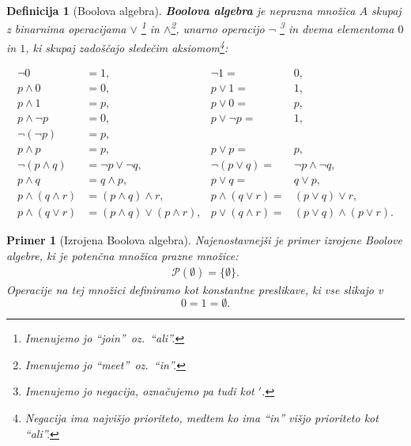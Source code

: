 \documentclass{amsart}
\newtheorem{definicija}[izrek]{Definicija}
\newtheorem{primer}[izrek]{Primer}
\begin{document}
\begin{definicija}[Boolova algebra]
    {\bf Boolova algebra} je neprazna množica \(A\) skupaj z binarnima operacijama \(\vee\) \footnote{Imenujemo jo ``join''\ oz.\ 
    ``ali''.} in \(\wedge\)\footnote{Imenujemo jo ``meet''\ oz.\ ``in''.}, unarno operacijo \(\neg\)
    \footnote{Imenujemo jo negacija, označujemo pa tudi kot \('\).} in dvema  
    elementoma \(0\) in \(1\), ki skupaj zadoščajo sledečim aksiomom\footnote{Negacija ima najvišjo prioriteto, medtem ko ima ``in'' višjo prioriteto kot ``ali''.}:

    \begin{align}
        \label{eq0}
        \neg 0 &= 1, & \neg 1 =& 0,\\ \label{eq1}
        p \wedge 0 &= 0, & p \vee 1 =& 1,\\ \label{eq2}
        p \wedge 1 &= p, & p \vee 0 =& p,\\ \label{eq3}
        p \wedge \neg p &= 0, & p \vee \neg p =& 1,\\ \label{eq4}
         \neg (\neg p) &= p,\\ \label{eq5}
        p \wedge p &= p, & p \vee p =& p,\\ \label{eq6}
        \neg (p \wedge q) &= \neg p \vee \neg q, & \neg (p \vee q) =& \neg p \wedge \neg q,\\ \label{eq7}
        p \wedge q &= q \wedge p, & p \vee q =& q \vee p,\\ \label{eq8}
        p \wedge (q \wedge r) &= (p \wedge q) \wedge r, & p \wedge (q \vee r) =& (p \vee q) \vee r,\\ \label{eq9}
        p \wedge (q \vee r) &= (p \wedge q) \vee (p \wedge r), & p \vee (q \wedge r) =& (p \vee q) \wedge (p \vee r).
    \end{align}
    
\end{definicija}

\begin{primer}[Izrojena Boolova algebra]
    Najenostavnejši je primer izrojene Boolove algebre, ki je potenčna množica prazne množice:
    \begin{align*}
        \mathcal{P}\left(\emptyset\right) = \{\emptyset\}.
    \end{align*}
    Operacije na tej množici definiramo kot konstantne preslikave, ki vse slikajo v \[0 = 1 = \emptyset.\]
\end{primer}
\end{document}
